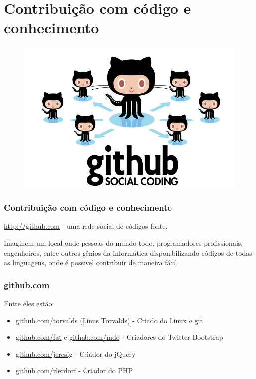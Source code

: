 \begin{frame}\frametitle{}


\end{frame}

\section{Contribuição com código e conhecimento}

\begin{frame}\frametitle{}


\begin{figure}
    \includegraphics[scale=0.3]{img/github.jpg}
\end{figure}

\end{frame}

\begin{frame}[fragile]\frametitle{Contribuição com código e
conhecimento}

\url{http://github.com} - uma rede social de códigos-fonte.

Imaginem um local onde pessoas do mundo todo, programadores
profissionais, engenheiros, entre outros gênios da informática
disponibilizando códigos de todas as linguagens, onde é possível
contribuir de maneira fácil.

\end{frame}

\begin{frame}\frametitle{github.com}

Entre eles estão:

\begin{itemize}
\item
  \href{https://github.com/torvalds}{github.com/torvalds (Linus
  Torvalds)} - Criado do Linux e git
\item
  \href{https://github.com/fat}{github.com/fat} e
  \href{https://github.com/mdo}{github.com/mdo} - Criadores do Twitter
  Bootstrap
\item
  \href{https://github.com/jeresig}{github.com/jeresig} - Criador do
  jQuery
\item
  \href{https://github.com/rlerdorf}{github.com/rlerdorf} - Criador do
  PHP
\end{itemize}
\end{frame}

